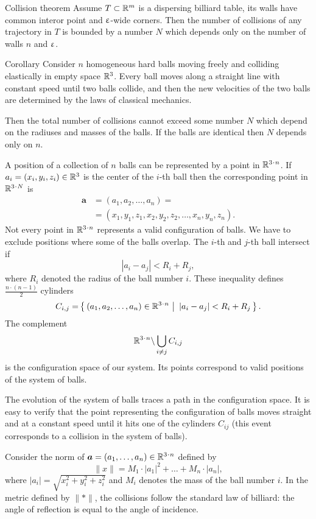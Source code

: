 \begin{thm}{Collision theorem}\label{thm:baby-collision}
Assume $T\subset\RR^m$
is a dispersing billiard table,
its walls have common interor point and $\upvarepsilon$-wide corners.
Then the number of collisions of any trajectory in  $T$  is bounded
by a number $N$ which depends only on the number of walls $n$ and $\upvarepsilon$.
\end{thm}

\begin{thm}{Corollary}\label{cor:balls}
Consider $n$ homogeneous hard balls
moving freely and colliding
elastically in empty space $\mathbb{R}^3$. 
Every ball moves
along a straight line with constant speed until two balls collide, and then
the new velocities of the two balls are determined by the
laws of classical mechanics.

Then the total number of collisions cannot exceed some number $N$ which depend on the radiuses and masses of the balls.
If the balls are identical then $N$ depends only on $n$.
\end{thm}

A position of a collection of $n$ balls can be represented by a point in $\RR^{3\cdot n}$.
If $a_i=(x_i,y_i,z_i) \in \RR^3$ is the center of the $i$-th ball
then
the corresponding point in $\RR^{3\cdot N}$ is
\begin{align*}
\bm{a}&=(a_1, a_2 , \dots , a_n ) =
\\
&=(x_1, y_1 , z_1 , x_2 , y_2 , z_2 , \dots , x_n , y_n , z_n).
\end{align*}
Not every point in $\RR^{3\cdot n}$ represents a valid configuration of balls. 
We have to exclude positions where some of the balls overlap. 
The $i$-th and $j$-th ball intersect if 
$$|a_i - a_j | < R_i+R_j,$$
where $R_i$ denoted the radius of the ball number $i$.
These inequality defines $\tfrac{n\cdot(n-1)}{2}$ cylinders 
\[C_{i,j}=\set{(a_1, a_2 , \dots , a_n )\in\RR^{3\cdot n}} {|a_i - a_j | < R_i+R_j}.\] 
The complement
\[\RR^{3\cdot n}\backslash \bigcup_{i\ne j} C_{i,j}\] 
is the configuration space of our system. 
Its points correspond
to valid positions of the system of balls.

The evolution of the system
of balls traces a path in the configuration space. 
It is easy to verify that
the point representing the configuration of balls moves straight and at a
constant speed until it hits one of the cylinders $C_{ij}$ (this event corresponds
to a collision in the system of balls).

Consider the norm of $\bm{a}=(a_1,\dots,a_n)\in \RR^{3\cdot n}$ defined by
\[\lVert x\rVert=M_1\cdot|a_1|^2+\dots+M_n\cdot |a_n|,\]
where $|a_i|=\sqrt{x_i^2+y_i^2+z_i^2}$ 
and $M_i$ denotes the mass of the ball number $i$.
In the metric defined by $\lVert {*}\rVert$,
the collisions follow the
standard law of billiard: 
the angle of reflection is equal to the angle
of incidence. 

